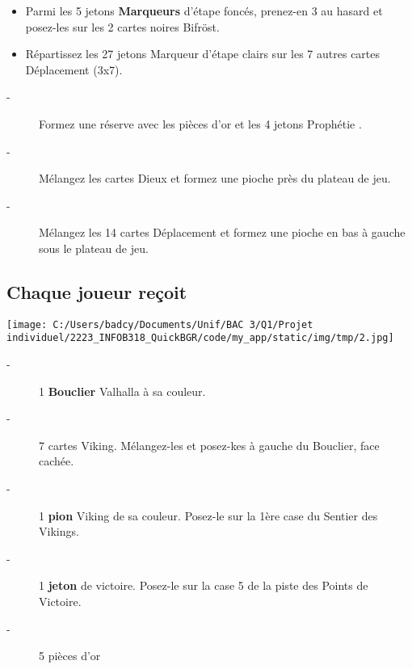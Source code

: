 \documentclass{scrartcl}%
\begin{document}
\begin{itemize}%
\item%
%
 Parmi les 5 jetons %
\textbf{Marqueurs}%
\textit{ }%
 d'étape foncés, prenez{-}en 3 au hasard et posez{-}les sur les 2 cartes noires Bifröst.
%
\item%
%
 Répartissez les 27 jetons Marqueur d'étape clairs sur les 7 autres cartes Déplacement (3x7).
%
\end{itemize}%
\begin{description}%
\item[{-} ]%
%
 Formez une réserve avec les pièces d'or et les 4 jetons Prophétie .
%
\item[{-} ]%
%
 Mélangez les cartes Dieux et formez une pioche près du plateau de jeu.
%
\item[{-} ]%
%
 Mélangez les 14 cartes Déplacement et formez une pioche en bas à gauche sous le plateau de jeu. 
%
\end{description}

%
\subsection{ Chaque joueur reçoit
}%
\label{subsec:Chaquejoueurreoit}%
%
\begin{center}\texttt{[image: C:/Users/badcy/Documents/Unif/BAC 3/Q1/Projet individuel/2223\_INFOB318\_QuickBGR/code/my\_app/static/img/tmp/2.jpg]}\end{center}%

%
\begin{description}%
\item[{-} ]%
%
 1 %
\textbf{Bouclier}%
\textit{ }%
 Valhalla à sa couleur.
%
\item[{-} ]%
%
 7 cartes Viking. Mélangez{-}les et posez{-}kes à gauche du Bouclier, face cachée.
%
\item[{-} ]%
%
 1 %
\textbf{pion}%
\textit{ }%
 Viking de sa couleur. Posez{-}le sur la 1ère case du Sentier des Vikings.
%
\item[{-} ]%
%
 1 %
\textbf{jeton}%
\textit{ }%
 de victoire. Posez{-}le sur la case 5 de la piste des Points de Victoire.
%
\item[{-} ]%
%
 5 pièces d'or
%
\end{description}

%
\end{document}
